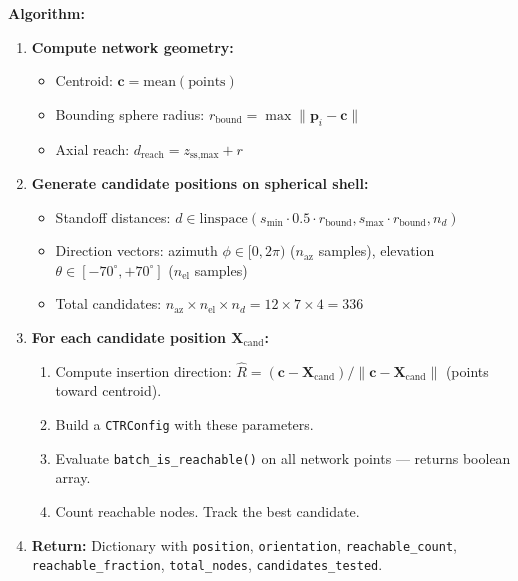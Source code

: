 \documentclass[11pt,a4paper]{article}
\newcommand{\funcname}[1]{\texttt{\textcolor{codepurple}{#1}}}
\begin{document}
\textbf{Algorithm:}
\begin{enumerate}
    \item \textbf{Compute network geometry:}
    \begin{itemize}[nosep]
        \item Centroid: $\mathbf{c} = \text{mean}(\text{points})$
        \item Bounding sphere radius: $r_\text{bound} = \max \|\mathbf{p}_i - \mathbf{c}\|$
        \item Axial reach: $d_\text{reach} = z_\text{ss,max} + r$
    \end{itemize}

    \item \textbf{Generate candidate positions on spherical shell:}
    \begin{itemize}[nosep]
        \item Standoff distances: $d \in \text{linspace}(s_\text{min} \cdot 0.5 \cdot r_\text{bound}, s_\text{max} \cdot r_\text{bound}, n_d)$
        \item Direction vectors: azimuth $\phi \in [0, 2\pi)$ ($n_\text{az}$ samples), elevation $\theta \in [-70^\circ, +70^\circ]$ ($n_\text{el}$ samples)
        \item Total candidates: $n_\text{az} \times n_\text{el} \times n_d = 12 \times 7 \times 4 = 336$
    \end{itemize}

    \item \textbf{For each candidate position $\mathbf{X}_\text{cand}$:}
    \begin{enumerate}[nosep,label=(\alph*)]
        \item Compute insertion direction: $\hat{R} = (\mathbf{c} - \mathbf{X}_\text{cand}) / \|\mathbf{c} - \mathbf{X}_\text{cand}\|$ (points toward centroid).
        \item Build a \texttt{CTRConfig} with these parameters.
        \item Evaluate \funcname{batch\_is\_reachable()} on all network points --- returns boolean array.
        \item Count reachable nodes. Track the best candidate.
    \end{enumerate}

    \item \textbf{Return:} Dictionary with \texttt{position}, \texttt{orientation}, \texttt{reachable\_count}, \texttt{reachable\_fraction}, \texttt{total\_nodes}, \texttt{candidates\_tested}.
\end{enumerate}
\end{document}
